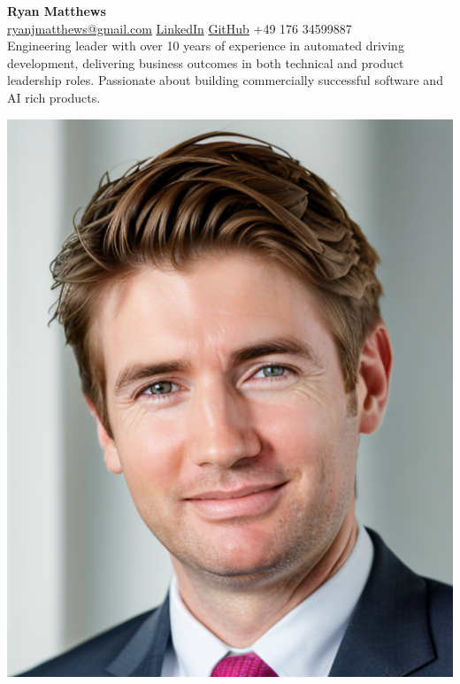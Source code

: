 \documentclass[10pt,a4paper]{article}
\begin{document}
\begin{minipage}[t]{0.7\textwidth}
    \textbf{\LARGE Ryan Matthews}\\
    \vspace{0.1cm}
    \href{mailto:ryanjmatthews@gmail.com}{ryanjmatthews@gmail.com} \quad
    \href{https://linkedin.com/in/ryan-j-matthews}{LinkedIn} \quad
    \href{https://github.com/Darainer}{GitHub} \quad
    +49 176 34599887\\
    \vspace{0.3cm}
    Engineering leader with over 10 years of experience in automated driving development, delivering business outcomes in both technical and product leadership roles. Passionate about building commercially successful software and AI rich products.
\end{minipage}
\hfill
\begin{minipage}[t]{0.25\textwidth}
    \includegraphics[width=\linewidth]{profile_pic_ryan.png}
\end{minipage}

\vspace{0.5cm}
\end{document}

